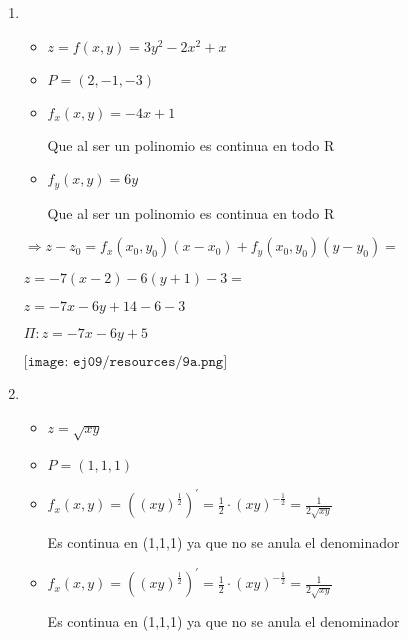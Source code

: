 \documentclass[../practica_04.tex]{subfiles}
\begin{document}
    \begin{enumerate}
        \item 
            \begin{itemize}
                \item $z = f(x,y) = 3y^2-2x^2+x$
                \item $P = (2,-1,-3)$
            \end{itemize}

            \begin{itemize}
                \item $f_x(x,y) = -4x + 1$

                    Que al ser un polinomio es continua en todo R
                \item $f_y(x,y) = 6y$

                    Que al ser un polinomio es continua en todo R
            \end{itemize}

            $ \Rightarrow z - z_0 = f_x(x_0,y_0)(x - x_0) + f_y(x_0,y_0)(y-y_0) =$

            $ z = -7(x - 2) - 6(y+1) - 3 = $

            $ z = -7x -6y + 14 - 6 - 3 $

            $ \Pi: z = -7x -6y + 5 $

            $ \texttt{[image: ej09/resources/9a.png]}  $

        \item 
            \begin{itemize}
                \item $z = \sqrt{xy}$
                \item $P= (1,1,1)$
            \end{itemize}

            \begin{itemize}
                \item $f_x(x,y) = ((xy)^{\frac{1}{2}})^{\prime} = \frac{1}{2}\cdot (xy)^{-\frac{1}{2}} = \frac{1}{2\sqrt{xy}}$

                    Es continua en (1,1,1) ya que no se anula el denominador

                \item $f_x(x,y) = ((xy)^{\frac{1}{2}})^{\prime} = \frac{1}{2}\cdot (xy)^{-\frac{1}{2}} = \frac{1}{2\sqrt{xy}}$

                    Es continua en (1,1,1) ya que no se anula el denominador
            \end{itemize}


\end{enumerate}
\end{document}
